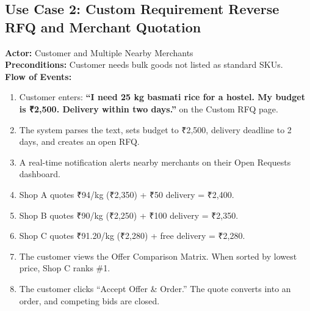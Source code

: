 \subsection{Use Case 2: Custom Requirement Reverse RFQ and Merchant Quotation}
\textbf{Actor:} Customer and Multiple Nearby Merchants\\
\textbf{Preconditions:} Customer needs bulk goods not listed as standard SKUs.\\
\textbf{Flow of Events:}
\begin{enumerate}
    \item Customer enters: \textbf{``I need 25 kg basmati rice for a hostel. My budget is ₹2,500. Delivery within two days.''} on the Custom RFQ page.
    \item The system parses the text, sets budget to ₹2,500, delivery deadline to 2 days, and creates an open RFQ.
    \item A real-time notification alerts nearby merchants on their Open Requests dashboard.
    \item Shop A quotes ₹94/kg (₹2,350) + ₹50 delivery = ₹2,400.
    \item Shop B quotes ₹90/kg (₹2,250) + ₹100 delivery = ₹2,350.
    \item Shop C quotes ₹91.20/kg (₹2,280) + free delivery = ₹2,280.
    \item The customer views the Offer Comparison Matrix. When sorted by lowest price, Shop C ranks \#1.
    \item The customer clicks ``Accept Offer \& Order.'' The quote converts into an order, and competing bids are closed.
\end{enumerate}

